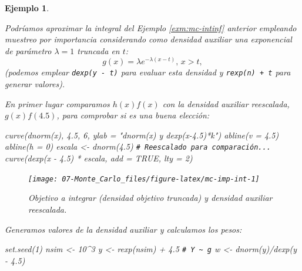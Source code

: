 \documentclass[
]{book}
\newenvironment{Shaded}{\begin{snugshade}}{\end{snugshade}}
\newcommand{\AttributeTok}[1]{\textcolor[rgb]{0.77,0.63,0.00}{#1}}
\newcommand{\CommentTok}[1]{\textcolor[rgb]{0.56,0.35,0.01}{\textit{#1}}}
\newcommand{\ConstantTok}[1]{\textcolor[rgb]{0.00,0.00,0.00}{#1}}
\newcommand{\DecValTok}[1]{\textcolor[rgb]{0.00,0.00,0.81}{#1}}
\newcommand{\FloatTok}[1]{\textcolor[rgb]{0.00,0.00,0.81}{#1}}
\newcommand{\FunctionTok}[1]{\textcolor[rgb]{0.00,0.00,0.00}{#1}}
\newcommand{\NormalTok}[1]{#1}
\newcommand{\OtherTok}[1]{\textcolor[rgb]{0.56,0.35,0.01}{#1}}
\newcommand{\SpecialCharTok}[1]{\textcolor[rgb]{0.00,0.00,0.00}{#1}}
\newcommand{\StringTok}[1]{\textcolor[rgb]{0.31,0.60,0.02}{#1}}
\theoremstyle{break}
\newtheorem{example}{Ejemplo}[chapter]
\theoremstyle{nonumberplain}
\renewcommand{\CommentTok}[1]{\textcolor[rgb]{0.41,0.41,0.41}{\texttt{#1}}}
\begin{document}
\begin{example}
\protect\hypertarget{exm:mc-imp}{}\label{exm:mc-imp}

Podríamos aproximar la integral del Ejemplo \ref{exm:mc-intinf} anterior empleando muestreo por importancia considerando como densidad auxiliar una exponencial de parámetro \(\lambda=1\) truncada en \(t\):
\[g(x) = \lambda e^{-\lambda (x - t)}\text{, }x>t,\]
(podemos emplear \texttt{dexp(y\ -\ t)} para evaluar esta densidad y \texttt{rexp(n)\ +\ t} para generar valores).

En primer lugar comparamos \(h(x)f(x)\) con la densidad auxiliar reescalada, \(g(x)f(4.5)\), para comprobar si es una buena elección:

\begin{Shaded}
\begin{Highlighting}[]
\FunctionTok{curve}\NormalTok{(}\FunctionTok{dnorm}\NormalTok{(x), }\FloatTok{4.5}\NormalTok{, }\DecValTok{6}\NormalTok{, }\AttributeTok{ylab =} \StringTok{"dnorm(x) y dexp(x{-}4.5)*k"}\NormalTok{)}
\FunctionTok{abline}\NormalTok{(}\AttributeTok{v =} \FloatTok{4.5}\NormalTok{)}
\FunctionTok{abline}\NormalTok{(}\AttributeTok{h =} \DecValTok{0}\NormalTok{)}
\NormalTok{escala }\OtherTok{\textless{}{-}} \FunctionTok{dnorm}\NormalTok{(}\FloatTok{4.5}\NormalTok{)  }\CommentTok{\# Reescalado para comparación...}
\FunctionTok{curve}\NormalTok{(}\FunctionTok{dexp}\NormalTok{(x }\SpecialCharTok{{-}} \FloatTok{4.5}\NormalTok{) }\SpecialCharTok{*}\NormalTok{ escala, }\AttributeTok{add =} \ConstantTok{TRUE}\NormalTok{, }\AttributeTok{lty =} \DecValTok{2}\NormalTok{)  }
\end{Highlighting}
\end{Shaded}

\begin{figure}[!htb]

{\centering \texttt{[image: 07-Monte\_Carlo\_files/figure-latex/mc-imp-int-1]} 

}

\caption{Objetivo a integrar (densidad objetivo truncada) y densidad auxiliar reescalada.}\label{fig:mc-imp-int}
\end{figure}

Generamos valores de la densidad auxiliar y calculamos los pesos:

\begin{Shaded}
\begin{Highlighting}[]
\FunctionTok{set.seed}\NormalTok{(}\DecValTok{1}\NormalTok{)}
\NormalTok{nsim }\OtherTok{\textless{}{-}} \DecValTok{10}\SpecialCharTok{\^{}}\DecValTok{3}
\NormalTok{y }\OtherTok{\textless{}{-}} \FunctionTok{rexp}\NormalTok{(nsim) }\SpecialCharTok{+} \FloatTok{4.5}    \CommentTok{\#  Y \textasciitilde{} g}
\NormalTok{w }\OtherTok{\textless{}{-}} \FunctionTok{dnorm}\NormalTok{(y)}\SpecialCharTok{/}\FunctionTok{dexp}\NormalTok{(y }\SpecialCharTok{{-}} \FloatTok{4.5}\NormalTok{)}
\end{Highlighting}
\end{Shaded}


\end{example}
\end{document}
